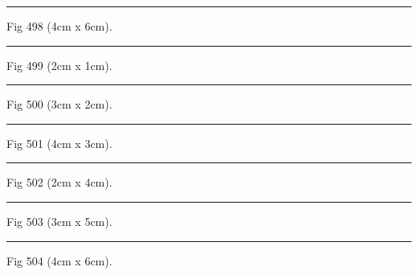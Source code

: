 \documentclass[a4paper,11pt]{article}
\begin{document}
\begin{swarmwrap}%
  \begin{minipage}[t]{4cm}
    \centering
    \rule{\linewidth}{6cm}
    {\footnotesize Fig 498 (4cm x 6cm).}
  \end{minipage}%
\end{swarmwrap}%
\swarmwrapnext
\lipsum[48]%

\begin{swarmwrap}%
  \begin{minipage}[t]{2cm}
    \centering
    \rule{\linewidth}{1cm}
    {\footnotesize Fig 499 (2cm x 1cm).}
  \end{minipage}%
\end{swarmwrap}%
\swarmwrapnext
\lipsum[49]%

\begin{swarmwrap}%
  \begin{minipage}[t]{3cm}
    \centering
    \rule{\linewidth}{2cm}
    {\footnotesize Fig 500 (3cm x 2cm).}
  \end{minipage}%
\end{swarmwrap}%
\swarmwrapnext
\lipsum[50]%

\begin{swarmwrap}%
  \begin{minipage}[t]{4cm}
    \centering
    \rule{\linewidth}{3cm}
    {\footnotesize Fig 501 (4cm x 3cm).}
  \end{minipage}%
\end{swarmwrap}%
\swarmwrapnext
\lipsum[51]%

\begin{swarmwrap}%
  \begin{minipage}[t]{2cm}
    \centering
    \rule{\linewidth}{4cm}
    {\footnotesize Fig 502 (2cm x 4cm).}
  \end{minipage}%
\end{swarmwrap}%
\swarmwrapnext
\lipsum[52]%

\begin{swarmwrap}%
  \begin{minipage}[t]{3cm}
    \centering
    \rule{\linewidth}{5cm}
    {\footnotesize Fig 503 (3cm x 5cm).}
  \end{minipage}%
\end{swarmwrap}%
\swarmwrapnext
\lipsum[53]%

\begin{swarmwrap}%
  \begin{minipage}[t]{4cm}
    \centering
    \rule{\linewidth}{6cm}
    {\footnotesize Fig 504 (4cm x 6cm).}
  \end{minipage}%
\end{swarmwrap}%
\swarmwrapnext
\lipsum[54]%
\end{document}
